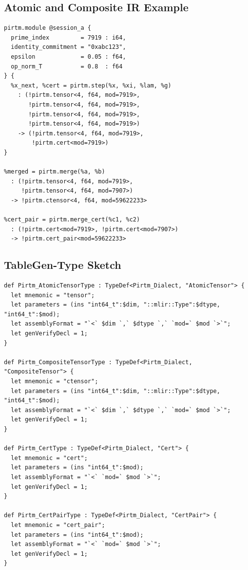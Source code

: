 \documentclass[11pt]{article}
\begin{document}
\subsection{Atomic and Composite IR Example}

\begin{lstlisting}[style=plain,caption={Illustrative MLIR-style syntax for atomic step and composite merge}]
pirtm.module @session_a {
  prime_index         = 7919 : i64,
  identity_commitment = "0xabc123",
  epsilon             = 0.05 : f64,
  op_norm_T           = 0.8  : f64
} {
  %x_next, %cert = pirtm.step(%x, %xi, %lam, %g)
    : (!pirtm.tensor<4, f64, mod=7919>,
       !pirtm.tensor<4, f64, mod=7919>,
       !pirtm.tensor<4, f64, mod=7919>,
       !pirtm.tensor<4, f64, mod=7919>)
    -> (!pirtm.tensor<4, f64, mod=7919>,
        !pirtm.cert<mod=7919>)
}

%merged = pirtm.merge(%a, %b)
  : (!pirtm.tensor<4, f64, mod=7919>,
     !pirtm.tensor<4, f64, mod=7907>)
  -> !pirtm.ctensor<4, f64, mod=59622233>

%cert_pair = pirtm.merge_cert(%c1, %c2)
  : (!pirtm.cert<mod=7919>, !pirtm.cert<mod=7907>)
  -> !pirtm.cert_pair<mod=59622233>
\end{lstlisting}

\subsection{TableGen-Type Sketch}

\begin{lstlisting}[style=plain,caption={Minimal type declarations consistent with the disclosed design}]
def Pirtm_AtomicTensorType : TypeDef<Pirtm_Dialect, "AtomicTensor"> {
  let mnemonic = "tensor";
  let parameters = (ins "int64_t":$dim, "::mlir::Type":$dtype, "int64_t":$mod);
  let assemblyFormat = "`<` $dim `,` $dtype `,` `mod=` $mod `>`";
  let genVerifyDecl = 1;
}

def Pirtm_CompositeTensorType : TypeDef<Pirtm_Dialect, "CompositeTensor"> {
  let mnemonic = "ctensor";
  let parameters = (ins "int64_t":$dim, "::mlir::Type":$dtype, "int64_t":$mod);
  let assemblyFormat = "`<` $dim `,` $dtype `,` `mod=` $mod `>`";
  let genVerifyDecl = 1;
}

def Pirtm_CertType : TypeDef<Pirtm_Dialect, "Cert"> {
  let mnemonic = "cert";
  let parameters = (ins "int64_t":$mod);
  let assemblyFormat = "`<` `mod=` $mod `>`";
  let genVerifyDecl = 1;
}

def Pirtm_CertPairType : TypeDef<Pirtm_Dialect, "CertPair"> {
  let mnemonic = "cert_pair";
  let parameters = (ins "int64_t":$mod);
  let assemblyFormat = "`<` `mod=` $mod `>`";
  let genVerifyDecl = 1;
}
\end{lstlisting}
\end{document}
